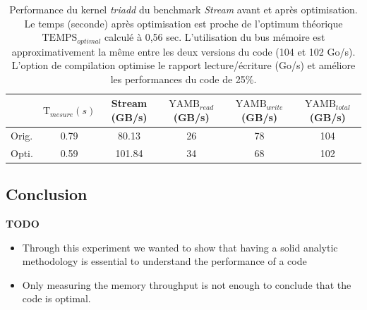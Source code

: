     \begin{table}[htbp]
        \centering

        \caption{Performance du kernel \textit{triadd} du benchmark \textit{Stream} avant et après optimisation. Le temps (seconde) après optimisation est proche de l'optimum théorique $\text{TEMPS}_{optimal}$  calculé à 0,56 sec. L'utilisation du bus mémoire est approximativement la même entre les deux versions du code (104 et 102 Go/s). L'option de compilation optimise le rapport lecture/écriture (Go/s) et améliore les performances du code de 25\%.}

            \begin{tabular}{l|c|c|c|c|c|}
            \cline{2-6}
                                            & $\text{T}_{mesure} (s)$ & Stream  (GB/s) & $\text{YAMB}_{read}$ (GB/s) & $\text{YAMB}_{write}$ (GB/s) & $\text{YAMB}_{total}$ (GB/s) \\ \hline
            \multicolumn{1}{|l|}{Orig.}  & 0.79   & 80.13  & 26        & 78         & 104        \\ \hline
            \multicolumn{1}{|l|}{Opti.} & 0.59   & 101.84 & 34        & 68         & 102        \\ \hline
            \end{tabular}
            \label{table:stream_res}
        \end{table}
    
    
    

\subsection{Conclusion}

\textbf{TODO}
\begin{itemize}
    \item Through this experiment we wanted to show that having a solid analytic methodology is essential to understand the performance of a code
    \item Only measuring the memory throughput is not enough to conclude that the code is optimal. 
\end{itemize}


%
